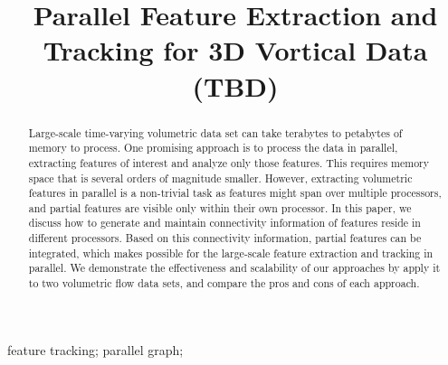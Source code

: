 \documentclass[10pt, conference, compsocconf]{IEEEtran}
\begin{document}
\title{Parallel Feature Extraction and Tracking for 3D Vortical Data (TBD)}


\author{
\and
{}
}

\maketitle


\begin{abstract}
Large-scale time-varying volumetric data set can take terabytes to petabytes of memory to process. One promising approach is to process the data in parallel, extracting features of interest and analyze only those features. This requires memory space that is several orders of magnitude smaller. However, extracting volumetric features in parallel is a non-trivial task as features might span over multiple processors, and partial features are visible only within their own processor. In this paper, we discuss how to generate and maintain connectivity information of features reside in different processors. Based on this connectivity information, partial features can be integrated, which makes possible for the large-scale feature extraction and tracking in parallel. We demonstrate the effectiveness and scalability of our approaches by apply it to two volumetric flow data sets, and compare the pros and cons of each approach.
\end{abstract}

\begin{IEEEkeywords}
feature tracking; parallel graph;
\end{IEEEkeywords}
\end{document}
